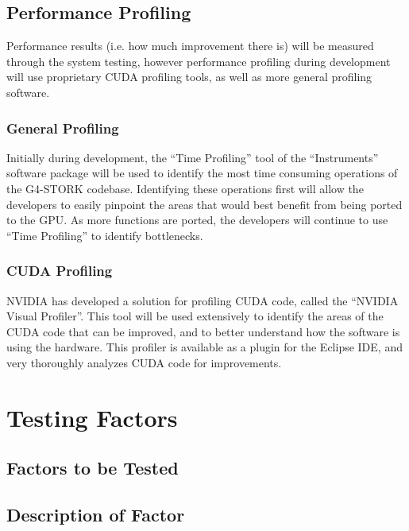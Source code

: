 \documentclass[12pt]{article}
\begin{document}
\subsection{Performance Profiling}
Performance results (i.e. how much improvement there is) will be measured through the system testing, however performance profiling during development will use proprietary CUDA profiling tools, as well as more general profiling software. 

\subsubsection{General Profiling}
Initially during development, the ``Time Profiling'' tool of the ``Instruments'' software package will be used to identify the most time consuming operations of the G4-STORK codebase. Identifying these operations first will allow the developers to easily pinpoint the areas that would best benefit from being ported to the GPU. As more functions are ported, the developers will continue to use ``Time Profiling'' to identify bottlenecks.

\subsubsection{CUDA Profiling}
NVIDIA has developed a solution for profiling CUDA code, called the ``NVIDIA Visual Profiler''. This tool will be used extensively to identify the areas of the CUDA code that can be improved, and to better understand how the software is using the hardware. This profiler is available as a plugin for the Eclipse IDE, and very thoroughly analyzes CUDA code for improvements.

\section{Testing Factors}

\subsection{Factors to be Tested} %

\subsection{Description of Factor} %
\end{document}
